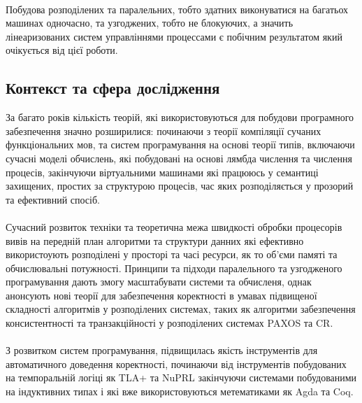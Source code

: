 \documentclass[11pt,oneside]{article}
\begin{document}
   \paragraph{}
   Побудова розподілених та паралельних, тобто здатних виконуватися на багатьох машинах одночасно, та
   узгоджених, тобто не блокуючих, а значить лінеаризованих систем управліннями процессами є побічним
   результатом який очікується від цієї роботи.

\newpage
\subsection{Контекст та сфера дослідження}

\vspace{0.5cm}
   За багато років кількість теорій, які використовуються для побудови програмного забезпечення значно розширилися:
   починаючи з теорії компіляції сучаних функціональних мов, та систем програмування на основі теорії типів,
   включаючи сучасні моделі обчислень, які побудовані на основі лямбда числення та числення процесів, закінчуючи віртуальними
   машинами які працююсь у семантиці захищених, простих за структурою процесів, час яких розподіляється
   у прозорий та ефективний спосіб.

   \paragraph{}
   Сучасний розвиток техніки та теоретична межа швидкості обробки процесорів вивів на передній план алгоритми та структури
   данних які ефективно використоують розподілені у просторі та часі ресурси, як то об’єми памяті та обчислювальні потужності.
   Принципи та підходи паралельного та узгодженого програмування дають змогу масштабувати системи та обчисленя, однак
   анонсують нові теорії для забезпечення коректності в умавах підвищеної складності алгоритмів у розподілених системах,
   таких як алгоритми забезпечення консистентності та транзакційності у розподілених системах PAXOS та CR.

   \paragraph{}
   З розвитком систем програмування, підвищилась якість інструментів для автоматичного доведення коректності,
   починаючи від інструментів побудованих на темпоральній логіці як TLA+ та NuPRL закінчуючи системами
   побудованими на індуктивних типах і які вже використовуються метематиками як Agda та Coq.
\end{document}
